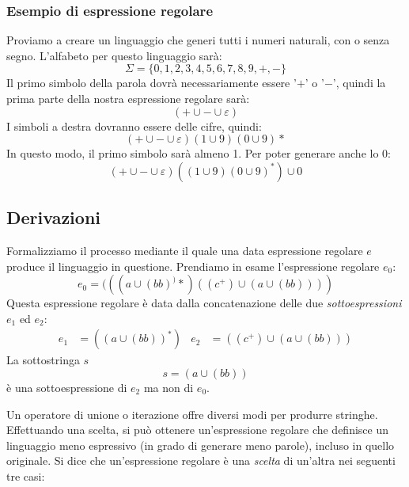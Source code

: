 \documentclass[11pt]{article}
\begin{document}
\subsubsection*{Esempio di espressione regolare}
Proviamo a creare un linguaggio che generi tutti i numeri naturali, con o senza segno. L'alfabeto per questo linguaggio 
sarà:
\begin{equation*}
    \Sigma=\{0,1,2,3,4,5,6,7,8,9,+,-\}
\end{equation*}
Il primo simbolo della parola dovrà necessariamente essere '$+$' o '$-$', quindi la prima parte della nostra espressione 
regolare sarà:
\begin{equation*}
    (+\cup -\cup \varepsilon)
\end{equation*}
I simboli a destra dovranno essere delle cifre, quindi:
\begin{equation*}
    (+\cup -\cup \varepsilon)(1\cup 9)(0\cup 9)*
\end{equation*}
In questo modo, il primo simbolo sarà almeno 1. Per poter generare anche lo 0:
\begin{equation*}
    (+\cup -\cup \varepsilon)((1\cup 9)(0\cup 9)^*)\cup 0
\end{equation*}
\subsection{Derivazioni}
Formalizziamo il processo mediante il quale una data espressione regolare $e$ produce il linguaggio in questione. Prendiamo 
in esame l'espressione regolare $e_0$:
\begin{equation*}
    e_0=(((a\cup (bb)^)*)((c^+)\cup(a\cup (bb))))
\end{equation*}
Questa espressione regolare è data dalla concatenazione delle due \textit{sottoespressioni} $e_1$ ed $e_2$:
\begin{align*}
    e_1&=((a\cup (bb))^*) & e_2&=((c^+)\cup(a\cup (bb)))
\end{align*}
La sottostringa $s$
\begin{equation*}
    s=(a\cup (bb))
\end{equation*}
è una sottoespressione di $e_2$ ma non di $e_0$.

Un operatore di unione o iterazione offre diversi modi per produrre stringhe. Effettuando una scelta, si può ottenere 
un'espressione regolare che definisce un linguaggio meno espressivo (in grado di generare meno parole), incluso in quello
originale. Si dice che un'espressione regolare è una \textit{scelta} di un'altra nei seguenti tre casi:
\end{document}
